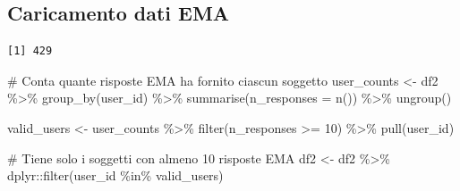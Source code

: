 \documentclass[
  11pt,
  a4paper,
  onecolumn]{article}
\newenvironment{Shaded}{}{}
\newcommand{\AttributeTok}[1]{\textcolor[rgb]{0.84,0.23,0.29}{#1}}
\newcommand{\CommentTok}[1]{\textcolor[rgb]{0.42,0.45,0.49}{#1}}
\newcommand{\DecValTok}[1]{\textcolor[rgb]{0.00,0.36,0.77}{#1}}
\newcommand{\FunctionTok}[1]{\textcolor[rgb]{0.44,0.26,0.76}{#1}}
\newcommand{\NormalTok}[1]{\textcolor[rgb]{0.14,0.16,0.18}{#1}}
\newcommand{\OtherTok}[1]{\textcolor[rgb]{0.44,0.26,0.76}{#1}}
\newcommand{\SpecialCharTok}[1]{\textcolor[rgb]{0.00,0.36,0.77}{#1}}
\newcommand{\StringTok}[1]{\textcolor[rgb]{0.01,0.18,0.38}{#1}}
\begin{document}
\subsection{Caricamento dati EMA}\label{caricamento-dati-ema}

\begin{Shaded}
\end{Shaded}

\begin{verbatim}
[1] 429
\end{verbatim}

\begin{Shaded}
\begin{Highlighting}[]
\CommentTok{\# Conta quante risposte EMA ha fornito ciascun soggetto}
\NormalTok{user\_counts }\OtherTok{\textless{}{-}}\NormalTok{ df2 }\SpecialCharTok{\%\textgreater{}\%}
  \FunctionTok{group\_by}\NormalTok{(user\_id) }\SpecialCharTok{\%\textgreater{}\%}
  \FunctionTok{summarise}\NormalTok{(}\AttributeTok{n\_responses =} \FunctionTok{n}\NormalTok{()) }\SpecialCharTok{\%\textgreater{}\%}
  \FunctionTok{ungroup}\NormalTok{()}

\NormalTok{valid\_users }\OtherTok{\textless{}{-}}\NormalTok{ user\_counts }\SpecialCharTok{\%\textgreater{}\%}
  \FunctionTok{filter}\NormalTok{(n\_responses }\SpecialCharTok{\textgreater{}=} \DecValTok{10}\NormalTok{) }\SpecialCharTok{\%\textgreater{}\%}
  \FunctionTok{pull}\NormalTok{(user\_id)}

\CommentTok{\# Tiene solo i soggetti con almeno 10 risposte EMA}
\NormalTok{df2 }\OtherTok{\textless{}{-}}\NormalTok{ df2 }\SpecialCharTok{\%\textgreater{}\%}
\NormalTok{  dplyr}\SpecialCharTok{::}\FunctionTok{filter}\NormalTok{(user\_id }\SpecialCharTok{\%in\%}\NormalTok{ valid\_users)}
\end{Highlighting}
\end{Shaded}
\end{document}
